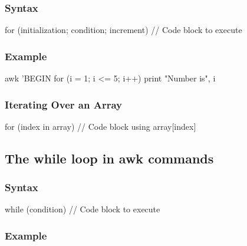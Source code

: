\documentclass{report}
\begin{document}
    \subsubsection{Syntax}
    \bigbreak \noindent 
    \begin{bashcode}
    for (initialization; condition; increment) {
        // Code block to execute
    }
    \end{bashcode}
    \bigbreak \noindent 
    \subsubsection{Example}
    \bigbreak \noindent 
    \begin{bashcode}
        awk 'BEGIN {
            for (i = 1; i <= 5; i++) {
                print "Number is", i
            }
        }
    \end{bashcode}

    \bigbreak \noindent 
    \subsubsection{Iterating Over an Array}
    \bigbreak \noindent 
    \begin{bashcode}
        for (index in array) {
            // Code block using array[index]
        }
    \end{bashcode}

    \bigbreak \noindent 
    \subsection{The while loop in awk commands}
    \bigbreak \noindent 
    \subsubsection{Syntax}
    \bigbreak \noindent 
    \begin{bashcode}
        while (condition) {
            // Code block to execute
        }
    \end{bashcode}
    \bigbreak \noindent 
    \subsubsection{Example}
    \bigbreak \noindent 
\end{document}
